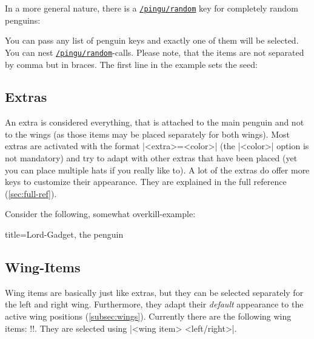 \documentclass[parskip=half,english,numbers=noenddot,footnotes=nomultiple,oneside]{scrartcl}
\makeatletter
\def\DTLlistformatitem#1{\textit{#1}}
\newcommand*\typesetselection[1][]{\begingroup\ifx!#1!\else\def\DTLlistformatitem##1{#1}\fi\dotypesetselection}
\def\dotypesetselection#1{\expandafter\DTLformatlist\expandafter{\csname @pingu@#1@\endcsname}\endgroup}
\def\lpingu#1{\lstinline[style=lstpingu,language=pingulang]'#1'}
\newcommand*\keyref[2][/pingu/]{\hyperref[pk:#1#2]{\lpingu{#1#2}}}
\makeatother
\begin{document}
In a more general nature, there is a \keyref{random} key for completely random penguins:

	You can pass any list of penguin keys and exactly one of them will be selected. You can nest \keyref{random}-calls. Please note, that the items are not separated by comma but in braces. The first line in the example sets the seed:
\begin{tcblisting}{}
\pgfmathsetseed{\number\pdfrandomseed}
\begin{tikzpicture}
	\pingu[random={{eye patch left}{eye patch right}{halo,halo raise=4mm}},random={{right eye color=green}{random={{bow tie}{gold medal}}}},random={{eyes=!random}{wings=!random}},body type=legacy]
\end{tikzpicture}
\end{tcblisting}
\endkeyexplain


\subsection{Extras}
An extra is considered everything, that is attached to the main penguin and not to the wings (as those items may be placed separately for both wings).
Most extras are activated with the format |<extra>=<color>| (the |<color>| option is not mandatory)
and try to adapt with other extras that have been placed (yet you can place multiple hats if you really like to).  A lot of the extras do offer more keys to customize their appearance.
They are explained in the full reference (\autoref{sec:full-ref}).

Consider the following, somewhat overkill-example:
\begin{tcblisting}{title={Lord-Gadget, the penguin}}
\begin{tikzpicture}
	\pingu[crown 2d=pingu@bronze,
	       medal=pingu@purple, tie,
	       eye patch left=teal,
	       eye patch right=orange,
	       right wing wave, sunglasses,
	       glow thick=yellow]
\end{tikzpicture}
\end{tcblisting}

\subsection{Wing-Items}
Wing items are basically just like extras, but they can be selected separately for the left and right wing. Furthermore, they adapt their \textit{default} appearance to the active wing positions (\autoref{subsec:wings}).
Currently there are the following wing items:
\typesetselection{wingitems}.
They are selected using |<wing item> <left/right>|.
\end{document}
